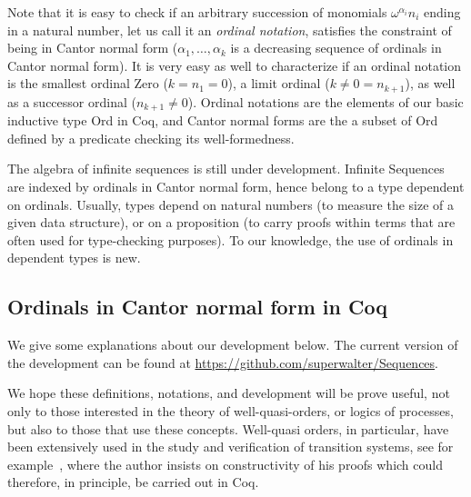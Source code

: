 \documentclass{llncs}
\begin{document}
Note that it is easy to check if an arbitrary succession of monomials
$\omega^{\alpha_i}n_i$
ending in a natural number, let us call it an \emph{ordinal notation},
satisfies the constraint of being in Cantor normal form ($\alpha_1,
\ldots, \alpha_k$ is a decreasing sequence of ordinals in Cantor
normal form).  It is very easy as well to characterize if an ordinal
notation is the smallest ordinal Zero ($k=n_{1}=0$), a limit ordinal
($k\neq 0=n_{k+1}$), as well as a successor ordinal ($n_{k+1}\neq
0$). Ordinal notations are the elements of our basic inductive
type Ord in Coq, and Cantor normal forms are the a subset of Ord defined by
a predicate checking its well-formedness.

The algebra of infinite sequences is still under development. Infinite
Sequences are indexed by ordinals in Cantor normal form, hence belong
to a type dependent on ordinals. Usually, types depend on natural
numbers (to measure the size of a given data structure), or on a
proposition (to carry proofs within terms that are often used for
type-checking purposes). To our knowledge, the use of ordinals in
dependent types is new.

\subsection{Ordinals in Cantor normal form in Coq}

We give some explanations about our development below.
The current version of the development can be found at
\url{https://github.com/superwalter/Sequences}.

We hope these definitions, notations, and development will be prove
useful, not only to those interested in the theory of
well-quasi-orders, or logics of processes, but also to those that use
these concepts. Well-quasi orders, in particular, have been
extensively used in the study and verification of transition systems,
see for example~\cite{JGL}, where the author insists on constructivity
of his proofs which could therefore, in principle, be carried out in Coq.
\end{document}
